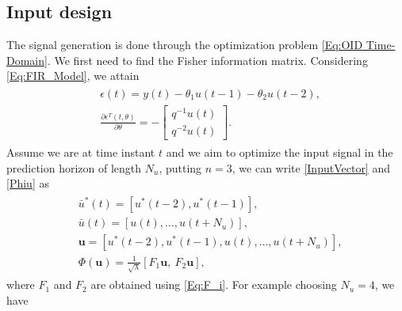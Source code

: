 \documentclass{ifacconf}
\begin{document}
\subsection{Input design}
The signal generation is done through the optimization problem \eqref{Eq:OID Time-Domain}. We first need to find the Fisher information matrix. Considering \eqref{Eq:FIR_Model}, we attain
\begin{eqnarray}
\begin{split}
&\epsilon(t) = y(t) - \theta_1 u(t-1) - \theta_2 u(t-2),\\
&\frac{\partial \epsilon^T(t,\theta)}{\partial \theta} =-
																	\begin{bmatrix}
																		q^{-1} u(t)\\
																		q^{-2} u(t)
																	\end{bmatrix}.
\end{split}
\end{eqnarray}
Assume we are at time instant $t$ and we aim to optimize the input signal in the prediction horizon of length $N_u$, putting $n=3$, we can write \eqref{InputVector} and \eqref{Phiu} as
\begin{eqnarray}
\begin{split}
&\bar{u}^*(t) = [u^*(t-2),u^*(t-1)],\\
&\bar{u}(t) = [u(t),\ldots,u(t+N_u)],\\
&\textbf{u} = [u^*(t-2),u^*(t-1),u(t),\ldots,u(t+N_u)],\\
&\Phi(\textbf{u}) =\frac{1}{\sqrt{\lambda}} [F_1 \textbf{u} ,\ F_2 \textbf{u}],
\end{split}
\end{eqnarray}
where $F_1$ and $F_2$ are obtained using \eqref{Eq:F_i}. For example choosing $N_u = 4$, we have
\end{document}
